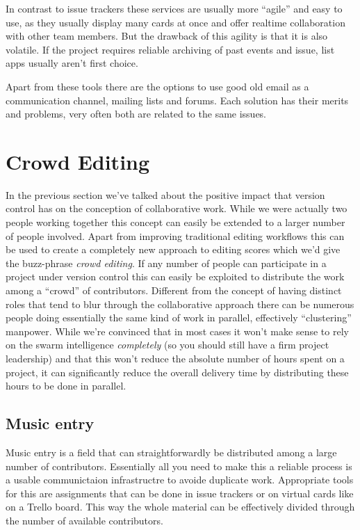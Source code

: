 \documentclass[11pt,a4paper]{article}
\begin{document}
In contrast to issue trackers these services are usually more “agile” and easy to use, as
they usually display many cards at once and offer realtime collaboration with other
team members. But the drawback of this agility is that it is also volatile. If the project
requires reliable archiving of past events and issue, list apps usually aren't first choice.

\medskip
Apart from these tools there are the options to use good old email as a communication channel, mailing lists and forums. Each solution has their merits and problems, very often both are related to the same issues.


\section{Crowd Editing}
In the previous section we've talked about the positive impact that version control
has on the conception of collaborative work. While we were actually two people
working together this concept can easily be extended to a larger number of people
involved. Apart from improving traditional editing workflows this can be used to create a
completely new approach to editing scores which we'd give the buzz-phrase \emph{crowd
editing}. If any number of people can participate in a project under version control
this can easily be exploited to distribute the work among a “crowd” of contributors.
Different from the concept of having distinct roles that tend to blur through the
collaborative approach there can be numerous people doing essentially the same kind
of work in parallel, effectively “clustering” manpower. While we're convinced that
in most cases it won't make sense to rely on the swarm intelligence \emph{completely} (so
you should still have a firm project leadership) and that this won't reduce the
absolute number of hours spent on a project, it can significantly reduce the overall
delivery time by distributing these hours to be done in parallel.

\subsection{Music entry}
Music entry is a field that can straightforwardly be distributed among a large number
of contributors. Essentially all you need to make this a reliable process is a usable
communictaion infrastructre to avoide duplicate work.
Appropriate tools for this are assignments that can be done in issue trackers or on
virtual cards like on a Trello board. This way the whole material can be
effectively divided through the number of available contributors.
\end{document}
